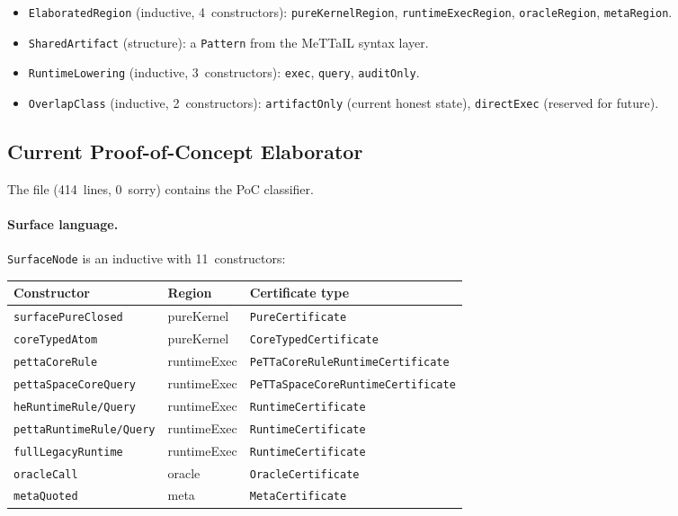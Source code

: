 \documentclass[11pt]{article}
\theoremstyle{remark}
\newcommand{\MeTTaIL}{\textup{MeTTaIL}}
\newcommand{\code}[1]{\texttt{#1}}
\newcommand{\codepath}[1]{\path{#1}}
\newcommand{\leanref}[1]{\texttt{#1}}
\begin{document}
\begin{itemize}[nosep]
  \item \leanref{ElaboratedRegion} (inductive, 4~constructors):
  \code{pureKernelRegion}, \code{runtimeExecRegion}, \code{oracleRegion},
  \code{metaRegion}.
  \item \leanref{SharedArtifact} (structure):
  a \leanref{Pattern} from the \MeTTaIL{} syntax layer.
  \item \leanref{RuntimeLowering} (inductive, 3~constructors):
  \code{exec}, \code{query}, \code{auditOnly}.
  \item \leanref{OverlapClass} (inductive, 2~constructors):
  \code{artifactOnly} (current honest state),
  \code{directExec} (reserved for future).
\end{itemize}

\subsection{Current Proof-of-Concept Elaborator}

The file \codepath{ElaboratedCore.lean} (414~lines, 0~sorry)
contains the PoC classifier.

\paragraph{Surface language.}
\leanref{SurfaceNode} is an inductive with 11~constructors:

\begin{center}
\small
\begin{tabular}{@{}lll@{}}
\toprule
Constructor & Region & Certificate type \\
\midrule
\code{surfacePureClosed} & pureKernel & \leanref{PureCertificate} \\
\code{coreTypedAtom} & pureKernel & \leanref{CoreTypedCertificate} \\
\code{pettaCoreRule} & runtimeExec & \leanref{PeTTaCoreRuleRuntimeCertificate} \\
\code{pettaSpaceCoreQuery} & runtimeExec & \leanref{PeTTaSpaceCoreRuntimeCertificate} \\
\code{heRuntimeRule/Query} & runtimeExec & \leanref{RuntimeCertificate} \\
\code{pettaRuntimeRule/Query} & runtimeExec & \leanref{RuntimeCertificate} \\
\code{fullLegacyRuntime} & runtimeExec & \leanref{RuntimeCertificate} \\
\code{oracleCall} & oracle & \leanref{OracleCertificate} \\
\code{metaQuoted} & meta & \leanref{MetaCertificate} \\
\bottomrule
\end{tabular}
\end{center}
\end{document}
